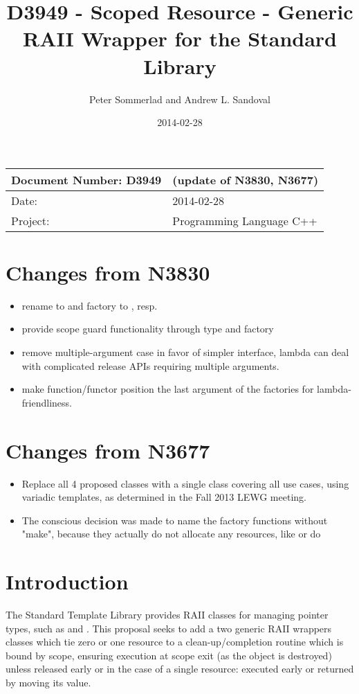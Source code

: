 \documentclass[ebook,11pt,article]{memoir}
\title{D3949 - Scoped Resource - Generic RAII Wrapper for the Standard Library}
\author{Peter Sommerlad and Andrew L. Sandoval}
\date{2014-02-28}                                           %
\begin{document}
\maketitle
\begin{tabular}[t]{|l|l|}\hline 
Document Number: D3949 &   (update of N3830, N3677)\\\hline
Date: & 2014-02-28 \\\hline
Project: & Programming Language C++\\\hline 
\end{tabular}

\chapter{Changes from N3830}
\begin{itemize}
\item rename to  and factory to , resp. 
\item provide scope guard functionality through type  and  factory
\item remove multiple-argument case in favor of simpler interface, lambda can deal with complicated release APIs requiring multiple arguments.
\item make function/functor position the last argument of the factories for lambda-friendliness.

\end{itemize}
\chapter{Changes from N3677}
\begin{itemize}
\item Replace all 4 proposed classes with a single class covering all use cases, using variadic templates, as determined in the Fall 2013 LEWG meeting.
\item The conscious decision was made to name the factory functions without "make", because they actually do not allocate any resources, like  or  do
\end{itemize}

\chapter{Introduction}
The Standard Template Library provides RAII classes for managing pointer types, such as  and .  This proposal seeks to add a two generic RAII wrappers classes which tie zero or one resource to a clean-up/completion routine which is bound by scope, ensuring execution at scope exit (as the object is destroyed) unless released early or in the case of a single resource: executed early or returned by moving its value.
\end{document}
